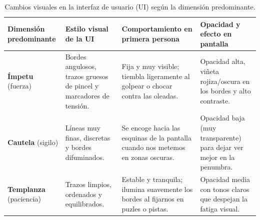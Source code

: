\begin{table}[H]
  \centering
  \caption{Cambios visuales en la interfaz de usuario (UI) según la dimensión predominante.}
  \label{tab:CambioVisualUI}
  \small
  \renewcommand{\arraystretch}{1.2}
  \begin{tabularx}{\textwidth}{>{\raggedright\arraybackslash}p{2.5cm}YYY}
    \toprule
    Dimensión predominante & Estilo visual de la UI & Comportamiento en primera persona & Opacidad y efecto en pantalla \\
    \midrule
    \textbf{Ímpetu} (fuerza) & Bordes angulosos, trazos gruesos de pincel y marcadores de tensión. & Fija y muy visible; tiembla ligeramente al golpear o chocar contra las oleadas. & Opacidad alta, viñeta rojiza/oscura en los bordes y alto contraste. \\
    \textbf{Cautela} (sigilo) & Líneas muy finas, discretas y bordes difuminados. & Se encoge hacia las esquinas de la pantalla cuando nos metemos en zonas oscuras. & Opacidad baja (muy transparente) para dejar ver mejor en la penumbra. \\
    \textbf{Templanza} (paciencia) & Trazos limpios, ordenados y equilibrados. & Estable y tranquila; ilumina suavemente los bordes al fijarnos en puzles o pistas. & Opacidad media con tonos claros que despejan la fatiga visual. \\
    \bottomrule
  \end{tabularx}
\end{table}